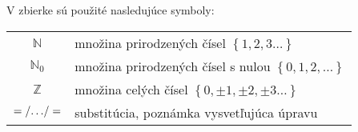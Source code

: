 V zbierke sú použité nasledujúce symboly:
\begin{center}
\begin{tabular}{cl}
$\mathbb{N}$ & množina prirodzených čísel $\left\{1,2,3\ldots\right\}$\\
$\mathbb{N}_0$ & množina prirodzených čísel s nulou $\left\{0,1,2,\ldots\right\}$\\
$\mathbb{Z}$ & množina celých čísel $\left\{0,\pm1,\pm2,\pm3\ldots\right\}$\\
$=\left/\ldots\right/=$ & substitúcia, poznámka vysvetľujúca úpravu
\end{tabular}
\end{center}
